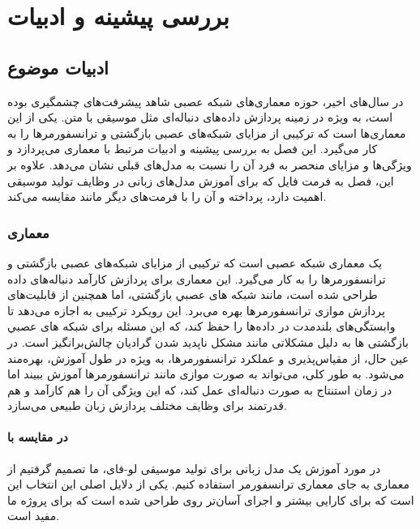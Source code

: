 
\chapter{بررسی پیشینه و ادبیات}
\section{ادبیات موضوع}

در سال‌های اخیر، حوزه معماری‌های شبکه عصبی شاهد پیشرفت‌های چشمگیری بوده است، به ویژه در زمینه پردازش داده‌های دنباله‌ای مثل موسیقی با متن. یکی از این معماری‌ها  است که ترکیبی از مزایای شبکه‌های عصبی بازگشتی و ترانسفورمرها را به کار می‌گیرد. این فصل به بررسی پیشینه و ادبیات مرتبط با معماری  می‌پردازد و ویژگی‌ها و مزایای منحصر به فرد آن را نسبت به مدل‌های قبلی نشان می‌دهد. علاوه بر این، فصل به فرمت فایل  که برای آموزش مدل‌های زبانی در وظایف تولید موسیقی اهمیت دارد، پرداخته و آن را با فرمت‌های دیگر مانند  مقایسه می‌کند.
\subsection{معماری }

  \cite{RWKV} \cite{peng2024eagle} یک معماری شبکه عصبی است که ترکیبی از مزایای شبکه‌های عصبی بازگشتی  \cite{1808.03314} و ترانسفورمرها  \cite{1706.03762} را به کار می‌گیرد. این معماری برای پردازش کارآمد دنباله‌های داده طراحی شده است، مانند ﺷﺒﻜﻪ ﻫﺎی ﻋﺼﺒﻲ ﺑﺎﺯگشتی، اما همچنین از قابلیت‌های پردازش موازی ترانسفورمرها بهره می‌برد. این رویکرد ترکیبی به  اجازه می‌دهد تا وابستگی‌های بلندمدت در داده‌ها را حفظ کند، که این مسئله برای ﺷﺒﻜﻪ ﻫﺎی ﻋﺼﺒﻲ ﺑﺎﺯگشتی ها به دلیل مشکلاتی مانند مشکل ناپدید شدن گرادیان چالش‌برانگیز است. در عین حال، از مقیاس‌پذیری و عملکرد ترانسفورمرها، به ویژه در طول آموزش، بهره‌مند می‌شود. به طور کلی،  می‌تواند به صورت موازی مانند ترانسفورمرها آموزش ببیند اما در زمان استنتاج  به صورت دنباله‌ای عمل کند، که این ویژگی آن را هم کارآمد و هم قدرتمند برای وظایف مختلف پردازش زبان طبیعی می‌سازد.

\subsubsection{ در مقایسه با }
در مورد آموزش یک مدل زبانی برای تولید موسیقی لو-فای، ما تصمیم گرفتیم از معماری  به جای معماری ترانسفورمر استفاده کنیم. یکی از دلایل اصلی این انتخاب این است که  برای کارایی بیشتر و اجرای آسان‌تر روی  طراحی شده است که برای پروژه ما مفید است.

